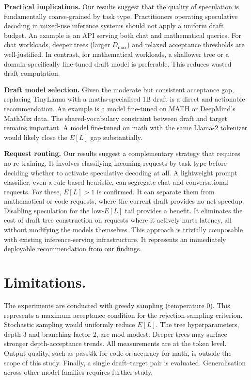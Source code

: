 \documentclass[conference]{IEEEtran}
\begin{document}
\textbf{Practical implications.} Our results suggest that the quality of
speculation is fundamentally coarse-grained by task type. Practitioners
operating speculative decoding in mixed-use inference systems should not
apply a uniform draft budget. An example is an API serving both chat and
mathematical queries. For chat workloads, deeper trees (larger $D_{\max}$) and
relaxed acceptance thresholds are well-justified. In contrast, for mathematical
workloads, a shallower tree or a domain-specifically fine-tuned draft model is
preferable. This reduces wasted draft computation.

\textbf{Draft model selection.} Given the moderate but consistent acceptance
gap, replacing TinyLlama with a maths-specialised 1B draft is a direct and
actionable recommendation. An example is a model fine-tuned on MATH or DeepMind's
MathMix data. The shared-vocabulary constraint between draft and target remains
important. A model fine-tuned on math with the same Llama-2 tokenizer would
likely close the $E[L]$ gap substantially.

\textbf{Request routing.} Our results suggest a complementary strategy
that requires no re-training. It involves classifying incoming requests by
task type before deciding whether to activate speculative decoding at all. A
lightweight prompt classifier, even a rule-based heuristic, can segregate
chat and conversational requests. For these, $E[L] > 1$ is confirmed. It
can separate them from mathematical or code requests, where the current
draft provides no net speedup. Disabling speculation for the low-$E[L]$ tail
provides a benefit. It eliminates the cost of draft tree construction on
requests where it actively hurts latency, all without modifying the models
themselves. This approach is trivially composable with existing inference-serving
infrastructure. It represents an immediately deployable recommendation from
our findings.

\section{Limitations.} The experiments are conducted with greedy sampling
(temperature 0). This represents a maximum acceptance condition for the
rejection-sampling criterion. Stochastic sampling would uniformly reduce
$E[L]$. The tree hyperparameters, depth 3 and branching factor 2, are
mod modest. Deeper trees may surface stronger depth-acceptance trends. All
measurements are at the token level. Output quality, such as pass@k for
code or accuracy for math, is outside the scope of this study. Finally, a
single draft--target pair is evaluated. Generalisation across other model
families requires further study.
\end{document}
